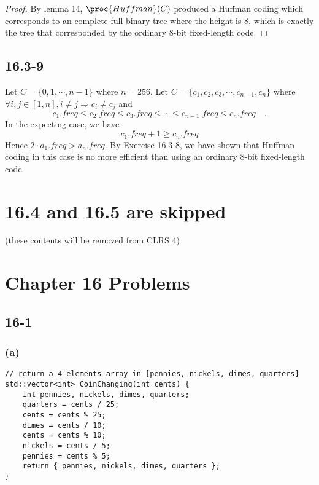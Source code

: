 \begin{proof}
    By lemma 14, $\proc{Huffman}(C)$ produced a Huffman coding 
    which corresponds to an complete full binary tree where the height is $8$,
    which is exactly the tree that corresponded by the ordinary 8-bit fixed-length code.
\end{proof}

\subsection*{16.3-9}


Let $C = \{ 0, 1, \cdots, n - 1 \}$ where $n = 256$.
Let $C = \{ c_1, c_2, c_3, \cdots, c_{n-1}, c_n \}$
where $\forall i,j \in [1,n], i \neq j \Longrightarrow c_i \neq c_j$
and
\begin{equation*}
    c_1.freq \leq c_2.freq \leq c_3.freq \leq 
    \cdots \leq c_{n-1}.freq \leq c_n.freq
    \quad .
\end{equation*}
In the expecting case, we have
\begin{equation*}
    c_1.freq + 1 \geq c_n.freq
\end{equation*}
Hence $2 \cdot a_1.freq > a_n.freq$.
By Exercise 16.3-8, we have shown that 
Huffman coding in this case is no more efficient than
using an ordinary 8-bit fixed-length code.

\section*{16.4 and 16.5 are skipped}

\centerline{(these contents will be removed from CLRS 4)}

\section*{Chapter 16 Problems}

\subsection*{16-1}

\subsubsection*{(a)}

\begin{verbatim}
// return a 4-elements array in [pennies, nickels, dimes, quarters]
std::vector<int> CoinChanging(int cents) {
    int pennies, nickels, dimes, quarters;
    quarters = cents / 25;
    cents = cents % 25;
    dimes = cents / 10;
    cents = cents % 10;
    nickels = cents / 5;
    pennies = cents % 5;
    return { pennies, nickels, dimes, quarters };
}
\end{verbatim}

